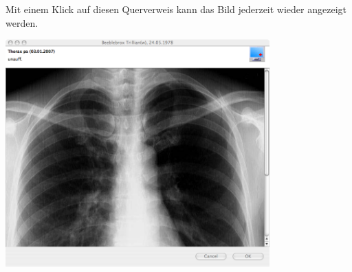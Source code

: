 Mit einem Klick auf diesen Querverweis kann das Bild jederzeit wieder angezeigt werden.

\includegraphics[width=4in]{images/bild3}
